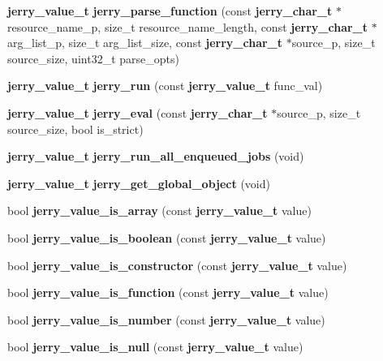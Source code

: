 \begin{DoxyCompactItemize}
\textbf{ jerry\+\_\+value\+\_\+t} {\bfseries jerry\+\_\+parse\+\_\+function} (const \textbf{ jerry\+\_\+char\+\_\+t} $\ast$resource\+\_\+name\+\_\+p, size\+\_\+t resource\+\_\+name\+\_\+length, const \textbf{ jerry\+\_\+char\+\_\+t} $\ast$arg\+\_\+list\+\_\+p, size\+\_\+t arg\+\_\+list\+\_\+size, const \textbf{ jerry\+\_\+char\+\_\+t} $\ast$source\+\_\+p, size\+\_\+t source\+\_\+size, uint32\+\_\+t parse\+\_\+opts)
\item 
\mbox{\label{group___core_ga58b222a6084ebf61d8b34730cac4af5b}} 
\textbf{ jerry\+\_\+value\+\_\+t} {\bfseries jerry\+\_\+run} (const \textbf{ jerry\+\_\+value\+\_\+t} func\+\_\+val)
\item 
\mbox{\label{group___core_gae481cd74d566fb16191e22202f14ae97}} 
\textbf{ jerry\+\_\+value\+\_\+t} {\bfseries jerry\+\_\+eval} (const \textbf{ jerry\+\_\+char\+\_\+t} $\ast$source\+\_\+p, size\+\_\+t source\+\_\+size, bool is\+\_\+strict)
\item 
\mbox{\label{group___core_ga6e0f4ea9f467f8b7e07f755b8845d511}} 
\textbf{ jerry\+\_\+value\+\_\+t} {\bfseries jerry\+\_\+run\+\_\+all\+\_\+enqueued\+\_\+jobs} (void)
\item 
\textbf{ jerry\+\_\+value\+\_\+t} \textbf{ jerry\+\_\+get\+\_\+global\+\_\+object} (void)
\item 
bool \textbf{ jerry\+\_\+value\+\_\+is\+\_\+array} (const \textbf{ jerry\+\_\+value\+\_\+t} value)
\item 
\mbox{\label{group___core_gaad66fafbad87d400f60d37a08737aec3}} 
bool {\bfseries jerry\+\_\+value\+\_\+is\+\_\+boolean} (const \textbf{ jerry\+\_\+value\+\_\+t} value)
\item 
\mbox{\label{group___core_ga657f71738fc501c3e51231f5c10fa257}} 
bool {\bfseries jerry\+\_\+value\+\_\+is\+\_\+constructor} (const \textbf{ jerry\+\_\+value\+\_\+t} value)
\item 
\mbox{\label{group___core_gac4e249ec76196a468430d63973c0c970}} 
bool {\bfseries jerry\+\_\+value\+\_\+is\+\_\+function} (const \textbf{ jerry\+\_\+value\+\_\+t} value)
\item 
\mbox{\label{group___core_ga4fcbde00e6a7c4e65361a7bd95c7015c}} 
bool {\bfseries jerry\+\_\+value\+\_\+is\+\_\+number} (const \textbf{ jerry\+\_\+value\+\_\+t} value)
\item 
\mbox{\label{group___core_gac1778897d89b388c3ee5531f49c6af2d}} 
bool {\bfseries jerry\+\_\+value\+\_\+is\+\_\+null} (const \textbf{ jerry\+\_\+value\+\_\+t} value)
\item 
\mbox{\label{group___core_ga28209f595fd9d4d09c52520bb5ad9d74}} 

\end{DoxyCompactItemize}
